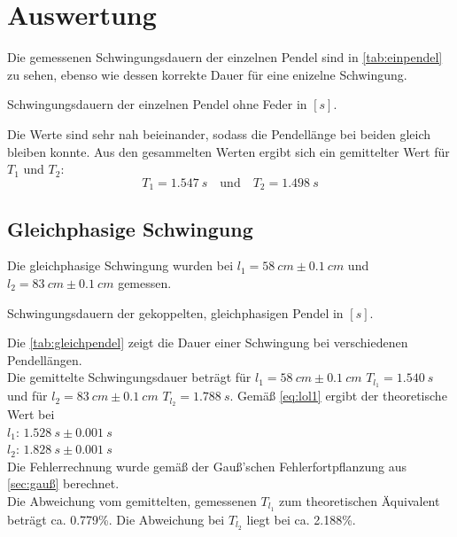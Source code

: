 \section{Auswertung}
\label{sec:Auswertung}

Die gemessenen Schwingungsdauern der einzelnen Pendel sind in \autoref{tab:einpendel} zu sehen, ebenso wie dessen korrekte Dauer für eine enizelne Schwingung.

\begin{table}
  \centering
  \caption{Schwingungsdauern der einzelnen Pendel ohne Feder in $[s]$.}
  \label{tab:einpendel}
\end{table}

Die Werte sind sehr nah beieinander, sodass die Pendellänge bei beiden gleich bleiben konnte.
Aus den gesammelten Werten ergibt sich ein gemittelter Wert für $T_1$ und $T_2$:
\begin{equation}
  T_1 = 1.547\ s \quad\textrm{und}\quad T_2 = 1.498\ s
\end{equation}
\subsection{Gleichphasige Schwingung}
Die gleichphasige Schwingung wurden bei $l_1 = 58\ cm\pm 0.1\ cm$ und $l_2 = 83\ cm\pm 0.1\ cm$ gemessen.

\begin{table}
  \centering
  \caption{Schwingungsdauern der gekoppelten, gleichphasigen Pendel in $[s]$.}
  \label{tab:gleichpendel}
\end{table}

Die \autoref{tab:gleichpendel} zeigt die Dauer einer Schwingung bei verschiedenen Pendellängen.\\
Die gemittelte Schwingungsdauer beträgt für $l_1 = 58\ cm\pm 0.1\ cm$ $T_{l_1} = 1.540\ s$ und für $l_2 = 83\ cm\pm 0.1\ cm$ $T_{l_2} = 1.788\ s$.
\newpage
Gemäß \autoref{eq:lol1} ergibt der theoretische Wert bei\\ $l_{1}$: $1.528\ s\pm0.001\ s$\\ $l_{2}$: $1.828\ s\pm0.001\ s$\\
Die Fehlerrechnung wurde gemäß der Gauß'schen Fehlerfortpflanzung aus \autoref{sec:gauß} berechnet.\\
Die Abweichung vom gemittelten, gemessenen $T_{l_1}$ zum theoretischen Äquivalent beträgt ca. 0.779\%.
Die Abweichung bei $T_{l_2}$ liegt bei ca. 2.188\%.

